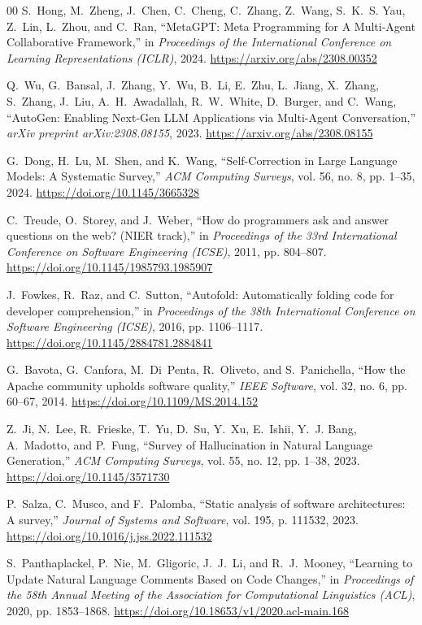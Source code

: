 \documentclass[conference]{IEEEtran}
\begin{document}
\begin{thebibliography}{00}
S.~Hong, M.~Zheng, J.~Chen, C.~Cheng, C.~Zhang, Z.~Wang, S.~K.~S. Yau, Z.~Lin, L.~Zhou, and C.~Ran, ``MetaGPT: Meta Programming for A Multi-Agent Collaborative Framework,'' in \emph{Proceedings of the International Conference on Learning Representations (ICLR)}, 2024. \url{https://arxiv.org/abs/2308.00352}

Q.~Wu, G.~Bansal, J.~Zhang, Y.~Wu, B.~Li, E.~Zhu, L.~Jiang, X.~Zhang, S.~Zhang, J.~Liu, A.~H.~Awadallah, R.~W.~White, D.~Burger, and C.~Wang, ``AutoGen: Enabling Next-Gen LLM Applications via Multi-Agent Conversation,'' \emph{arXiv preprint arXiv:2308.08155}, 2023. \url{https://arxiv.org/abs/2308.08155}

G.~Dong, H.~Lu, M.~Shen, and K.~Wang, ``Self-Correction in Large Language Models: A Systematic Survey,'' \emph{ACM Computing Surveys}, vol. 56, no. 8, pp. 1--35, 2024. \url{https://doi.org/10.1145/3665328}

C.~Treude, O.~Storey, and J.~Weber, ``How do programmers ask and answer questions on the web? (NIER track),'' in \emph{Proceedings of the 33rd International Conference on Software Engineering (ICSE)}, 2011, pp. 804--807. \url{https://doi.org/10.1145/1985793.1985907}

J.~Fowkes, R.~Raz, and C.~Sutton, ``Autofold: Automatically folding code for developer comprehension,'' in \emph{Proceedings of the 38th International Conference on Software Engineering (ICSE)}, 2016, pp. 1106--1117. \url{https://doi.org/10.1145/2884781.2884841}

G.~Bavota, G.~Canfora, M.~Di~Penta, R.~Oliveto, and S.~Panichella, ``How the Apache community upholds software quality,'' \emph{IEEE Software}, vol. 32, no. 6, pp. 60--67, 2014. \url{https://doi.org/10.1109/MS.2014.152}

Z.~Ji, N.~Lee, R.~Frieske, T.~Yu, D.~Su, Y.~Xu, E.~Ishii, Y.~J. Bang, A.~Madotto, and P.~Fung, ``Survey of Hallucination in Natural Language Generation,'' \emph{ACM Computing Surveys}, vol. 55, no. 12, pp. 1--38, 2023. \url{https://doi.org/10.1145/3571730}

P.~Salza, C.~Musco, and F.~Palomba, ``Static analysis of software architectures: A survey,'' \emph{Journal of Systems and Software}, vol. 195, p. 111532, 2023. \url{https://doi.org/10.1016/j.jss.2022.111532}

S.~Panthaplackel, P.~Nie, M.~Gligoric, J.~J.~Li, and R.~J.~Mooney, ``Learning to Update Natural Language Comments Based on Code Changes,'' in \emph{Proceedings of the 58th Annual Meeting of the Association for Computational Linguistics (ACL)}, 2020, pp. 1853--1868. \url{https://doi.org/10.18653/v1/2020.acl-main.168}


\end{thebibliography}
\end{document}
